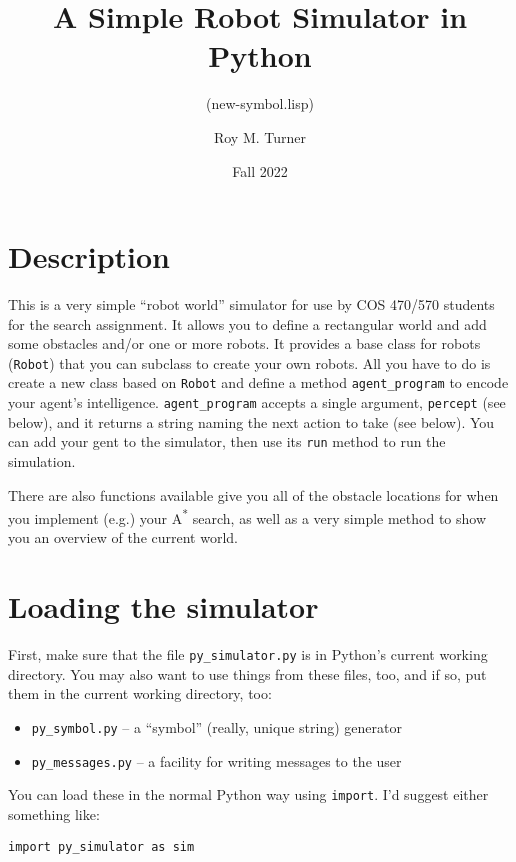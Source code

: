 \documentclass[11pt]{tufte-handout}
\subtitle{(new-symbol.lisp)}
\author{Roy M. Turner}
\date{Fall 2022}
\title{A Simple Robot Simulator in Python}
\begin{document}
\maketitle
\tableofcontents

\titlepage
\maketitle

\section{Description}
\label{sec:orgee45f98}

This is a very simple ``robot world''  simulator for use by COS 470/570  students for the search assignment. It allows you to define a rectangular world and add some obstacles and/or one or more robots.  It provides a base class for robots (\texttt{Robot}) that you can subclass to create your own robots.  All you have to do is create a new class based on \texttt{Robot} and define a method \texttt{agent\_program} to encode your agent's intelligence.  \texttt{agent\_program} accepts a single argument, \texttt{percept} (see below), and it returns a string naming the next action to take (see below).  You can add your gent to the simulator, then use its \texttt{run} method to run the simulation.

There are also functions available give you all of the obstacle locations for when you implement (e.g.) your A\textsuperscript{*} search, as well as a very simple method to show you an overview of the current world.

\section{Loading the simulator}
\label{sec:orgc6a56d7}

First, make sure that the file \texttt{py\_simulator.py} is in Python's current working directory.  You may also want to use things from these files, too, and if so, put them in the current working directory, too:
\begin{itemize}
\item \texttt{py\_symbol.py} -- a ``symbol'' (really, unique string) generator
\item \texttt{py\_messages.py} -- a facility for writing messages to the user
\end{itemize}

You can load these in the normal Python way using \texttt{import}.  I'd suggest either something like:
\begin{verbatim}
import py_simulator as sim
\end{verbatim}
\end{document}
